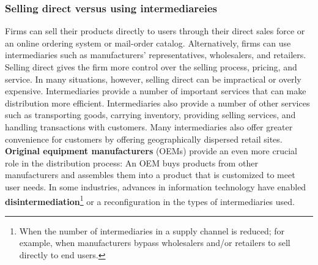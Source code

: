 \documentclass[12pt]{article}
\begin{document}
\subsubsection{Selling direct versus using intermediareies}
Firms can sell their products directly to users through their direct sales force or an
online ordering system or mail-order catalog. Alternatively, firms can use intermediaries such as manufacturers' representatives, wholesalers, and retailers.
Selling direct gives the firm more control over the selling process, pricing, and service.
In many situations, however, selling direct can be impractical or overly expensive.
Intermediaries provide a number of important services that can make distribution more
efficient.
Intermediaries also provide a number of other services such as transporting goods,
carrying inventory, providing selling services, and handling transactions with customers. Many intermediaries also offer greater convenience for customers by offering geographically dispersed retail sites.
\textbf{Original equipment manufacturers} (OEMs) provide an even more crucial role in the distribution process: An OEM buys products from other manufacturers and
assembles them into a product that is customized to meet user needs.
In some industries, advances in information technology have enabled \textbf{disintermediation}\footnote{When the
number of intermediaries in a
supply channel
is reduced; for
example, when
manufacturers
bypass wholesalers and/or retailers to sell directly
to end users.} or a reconfiguration in the types of intermediaries used.
\end{document}

